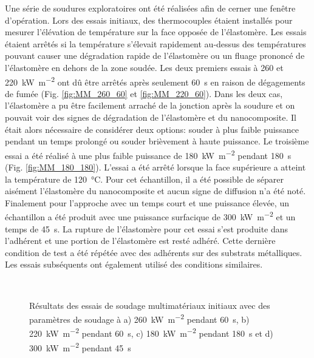 Une série de soudures exploratoires ont été réalisées afin de cerner une fenêtre d'opération. 
Lors des essais initiaux, des thermocouples étaient installés pour mesurer l'élévation de température sur la face opposée de l'élastomère. 
Les essais étaient arrêtés si la température s'élevait rapidement au-dessus des températures pouvant causer une dégradation rapide de l'élastomère ou un fluage prononcé de l'élastomère en dehors de la zone soudée. 
Les deux premiers essais à 260 et \SI[locale=FR]{220}{\kilo\watt\per\square\metre} ont dû être arrêtés après seulement \SI[locale=FR]{60}{\second} en raison de dégagements de fumée (Fig. \ref{fig:MM_260_60} et \ref{fig:MM_220_60}). 
Dans les deux cas, l'élastomère a pu être facilement arraché de la jonction après la soudure et on pouvait voir des signes de dégradation de l'élastomère et du nanocomposite. 
Il était alors nécessaire de considérer deux options: souder à plus faible puissance pendant un temps prolongé ou souder brièvement à haute puissance. 
Le troisième essai a été réalisé à une plus faible puissance de \SI[locale=FR]{180}{\kilo\watt\per\square\metre} pendant \SI[locale=FR]{180}{\second} (Fig. \ref{fig:MM_180_180}). 
L'essai a été arrêté lorsque la face supérieure a atteint la température de \SI[locale=FR]{120}{\celsius}. 
Pour cet échantillon, il a été possible de séparer aisément l'élastomère du nanocomposite et aucun signe de diffusion n'a été noté. 
Finalement pour l'approche avec un temps court et une puissance élevée, un échantillon a été produit avec une puissance surfacique de \SI[locale=FR]{300}{\kilo\watt\per\square\metre} et un temps de \SI[locale=FR]{45}{\second}. 
La rupture de l'élastomère pour cet essai s'est produite dans l'adhérent et une portion de l'élastomère est resté adhéré. 
Cette dernière condition de test a été répétée avec des adhérents sur des substrats métalliques. 
Les essais subséquents ont également utilisé des conditions similaires. 

\FloatBarrier
\begin{figure}[h]
	\centering
	 \qquad
	 \\
	
	 \qquad
	\caption{Résultats des essais de soudage multimatériaux initiaux avec des paramètres de soudage à a) \SI{260}{\kilo\watt\per\square\metre} pendant \SI{60}{\second}, b) \SI{220}{\kilo\watt\per\square\metre} pendant \SI{60}{\second}, c) \SI{180}{\kilo\watt\per\square\metre} pendant \SI{180}{\second} et d) \SI{300}{\kilo\watt\per\square\metre} pendant \SI{45}{\second}}
	\label{fig:MM_essais_initiaux}
\end{figure}
\FloatBarrier

